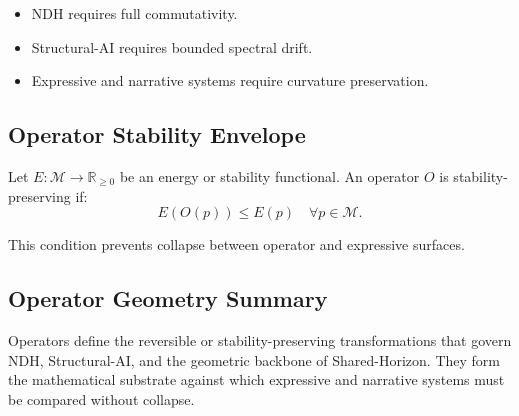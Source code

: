 \begin{itemize}
    \item NDH requires full commutativity.
    \item Structural-AI requires bounded spectral drift.
    \item Expressive and narrative systems require curvature preservation.
\end{itemize}

\subsection{Operator Stability Envelope}

Let $E : \mathcal{M} \rightarrow \mathbb{R}_{\ge 0}$ be an energy or stability
functional. An operator $O$ is stability-preserving if:
\[
E(O(p)) \le E(p) \quad \forall p \in \mathcal{M}.
\]

This condition prevents collapse between operator and expressive surfaces.

\subsection{Operator Geometry Summary}

Operators define the reversible or stability-preserving transformations that
govern NDH, Structural-AI, and the geometric backbone of Shared-Horizon.
They form the mathematical substrate against which expressive and narrative
systems must be compared without collapse.
